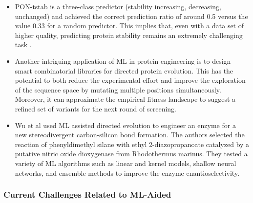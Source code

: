 \documentclass[12pt]{article}
\begin{document}
\begin{itemize}
\item PON-tstab is a three-class predictor (stability increasing, decreasing, unchanged) and achieved the correct prediction ratio of around 0.5 versus the value 0.33 for a random predictor. This implies that, even with a data set of higher quality, predicting protein stability remains an extremely challenging task \cite{5}.

\item Another intriguing application of ML in protein engineering is to design smart combinatorial libraries for directed protein evolution\cite{70}. This has the potential to both reduce the experimental effort and improve the exploration of the sequence space by mutating multiple positions simultaneously. Moreover, it can approximate the empirical fitness landscape to suggest a refined set of variants for the next round of screening.

\item Wu et al\cite{71} used ML assisted directed evolution to engineer an enzyme for a new stereodivergent carbon-silicon bond formation. The authors selected the reaction of phenyldimethyl silane with ethyl 2-diazopropanoate catalyzed by a putative nitric oxide dioxygenase from Rhodothermus marinus. They tested a variety of ML algorithms such as linear and kernel models, shallow neural networks, and ensemble methods to improve the enzyme enantioselectivity.

\end{itemize}


 
\subsubsection{Current Challenges Related to ML-Aided}
\end{document}
